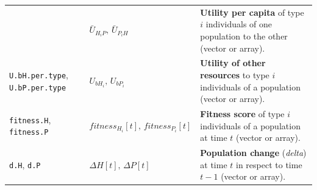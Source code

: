 \documentclass[]{book}
\begin{document}
\begin{longtable}[]{@{}lll@{}}
\begin{minipage}[t]{0.36\columnwidth}
\end{minipage} & \begin{minipage}[t]{0.21\columnwidth}\raggedright
\(\bar{U}_{H_{i}P},\,\bar{U}_{P_{i}H}\)\strut
\end{minipage} & \begin{minipage}[t]{0.34\columnwidth}\raggedright
\textbf{Utility per capita} of type \(i\) individuals of one population to the other (vector or array).\strut
\end{minipage}\tabularnewline
\begin{minipage}[t]{0.36\columnwidth}\raggedright
\texttt{U.bH.per.type}, \texttt{U.bP.per.type}\strut
\end{minipage} & \begin{minipage}[t]{0.21\columnwidth}\raggedright
\(U_{bH_{i}},\,U_{bP_{i}}\)\strut
\end{minipage} & \begin{minipage}[t]{0.34\columnwidth}\raggedright
\textbf{Utility of other resources} to type \(i\) individuals of a population (vector or array).\strut
\end{minipage}\tabularnewline
\begin{minipage}[t]{0.36\columnwidth}\raggedright
\texttt{fitness.H}, \texttt{fitness.P}\strut
\end{minipage} & \begin{minipage}[t]{0.21\columnwidth}\raggedright
\(fitness_{H_{i}}[t],\,fitness_{P_{i}}[t]\)\strut
\end{minipage} & \begin{minipage}[t]{0.34\columnwidth}\raggedright
\textbf{Fitness score} of type \(i\) individuals of a population at time \(t\) (vector or array).\strut
\end{minipage}\tabularnewline
\begin{minipage}[t]{0.36\columnwidth}\raggedright
\texttt{d.H}, \texttt{d.P}\strut
\end{minipage} & \begin{minipage}[t]{0.21\columnwidth}\raggedright
\(\Delta H[t],\,\Delta P[t]\)\strut
\end{minipage} & \begin{minipage}[t]{0.34\columnwidth}\raggedright
\textbf{Population change} (\emph{delta}) at time \(t\) in respect to time \(t -1\) (vector or array).\strut
\end{minipage}\tabularnewline
\bottomrule
\end{longtable}

\newpage
\end{document}
